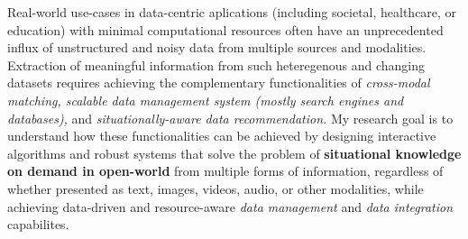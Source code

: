 
Real-world use-cases in data-centric aplications 
(including societal, healthcare, or education) with minimal computational resources %
often have an unprecedented influx of unstructured and noisy data from multiple sources and modalities. 
Extraction of meaningful information %
from such 
heteregenous and changing %
datasets requires achieving the complementary 
functionalities of 
\textit{
cross-modal matching,
scalable data management system (mostly search engines and databases),
}and \textit{situationally-aware data recommendation.}
My research goal is to understand how these
functionalities can be achieved by %
designing interactive algorithms and 
robust systems %
that solve the problem of 
\textbf{situational knowledge on demand in open-world}
from multiple forms of information, regardless of whether
presented as text, images, videos, audio, or other modalities,
while achieving data-driven and resource-aware \textit{data management} and \textit{data integration} capabilites. 